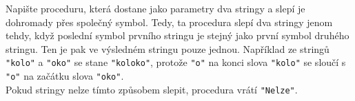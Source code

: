 \question[50]
Napište proceduru, která dostane jako parametry dva stringy a slepí je dohromady
přes společný symbol. Tedy, ta procedura slepí dva stringy jenom tehdy, když
poslední symbol prvního stringu je stejný jako první symbol druhého stringu. Ten
je pak ve výsledném stringu pouze jednou. Například ze stringů \texttt{"kolo"} a
\texttt{"oko"} se stane \texttt{"koloko"}, protože \texttt{"o"} na konci slova
\texttt{"kolo"} se sloučí s \texttt{"o"} na začátku slova \texttt{"oko"}.\\
Pokud stringy nelze tímto způsobem slepit, procedura vrátí \texttt{"Nelze"}.